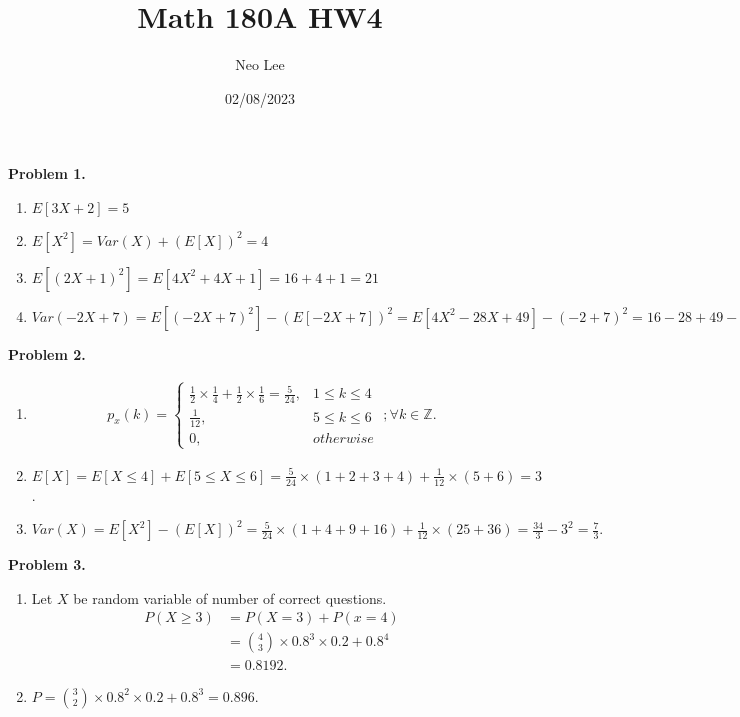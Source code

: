 \documentclass{article}
\title{Math 180A HW4}
\author{Neo Lee}
\date{02/08/2023}
\begin{document}
 

\maketitle 

\textbf{Problem 1.}
\begin{enumerate}[label={(\alph*)}]
    \item $E[3X + 2] = 5$
    \item $E[X^2] = Var(X)+(E[X])^2 = 4$ 
    \item $E[(2X+1)^2] = E[4X^2 + 4X + 1] = 16 + 4 + 1  = 21$
    \item $Var(-2X+7)=E[(-2X+7)^2]-(E[-2X+7])^2=E[4X^2-28X+49]-(-2+7)^2=16-28+49-25=12$
\end{enumerate}
\bigbreak

\textbf{Problem 2.}
\begin{enumerate}[label={(\alph*)}]
    \item 
    \begin{align}
        p_x(k) = \begin{cases}
            \frac{1}{2} \times \frac{1}{4} + \frac{1}{2} \times \frac{1}{6} = \frac{5}{24}, & 1 \le k \le 4 \\
            \frac{1}{12}, & 5 \le k \le 6 \\
            0, & otherwise
        \end{cases}
        \; ; \forall k \in \mathbb{Z}.
    \end{align}

    \item 
    $E[X]=E[X \le 4]+E[5 \le X \le 6]=\frac{5}{24} \times (1+2+3+4) + \frac{1}{12} \times (5+6)=3$.

    \item 
    $Var(X)=E[X^2]-(E[X])^2=\frac{5}{24} \times (1+4+9+16) + \frac{1}{12} \times (25+36)=\frac{34}{3}-3^2=\frac{7}{3}.$
\end{enumerate}
\bigbreak

\textbf{Problem 3.}
\begin{enumerate}[label={(\alph*)}]
    \item 
    Let $X$ be random variable of number of correct questions. 
    \begin{align}
        P(X \ge 3) & = P(X=3)+P(x=4) \\
        & = {4 \choose 3} \times 0.8^3 \times 0.2 + 0.8^4 \\
        & = 0.8192.
    \end{align}

    \item 
    $P = {3 \choose 2}\times 0.8^2 \times 0.2 + 0.8^3 = 0.896.$
\end{enumerate}
\bigbreak
\end{document}
